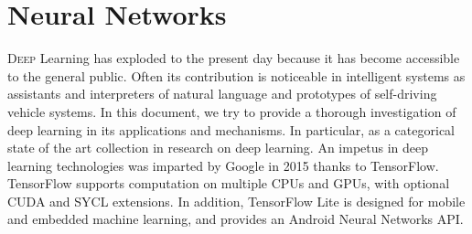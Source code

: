 \chapter{Neural Networks}
\label{chap:neuralnetworks}
%
\lettrine[lines=3]{D}{eep} Learning has exploded to the present day because it
has become accessible to the general public. Often its contribution is
noticeable in intelligent systems as assistants and interpreters of natural
language and prototypes of self-driving vehicle systems. In this document, we
try to provide a thorough investigation of deep learning in its applications and
mechanisms. In particular, as a categorical state of the art collection in
research on deep learning. An impetus in deep learning technologies was imparted
by Google in 2015 thanks to TensorFlow. TensorFlow supports computation on
multiple CPUs and GPUs, with optional CUDA and SYCL extensions. In addition,
TensorFlow Lite is designed for mobile and embedded machine learning, and
provides an Android Neural Networks API.\cite{article}
% 
% 




